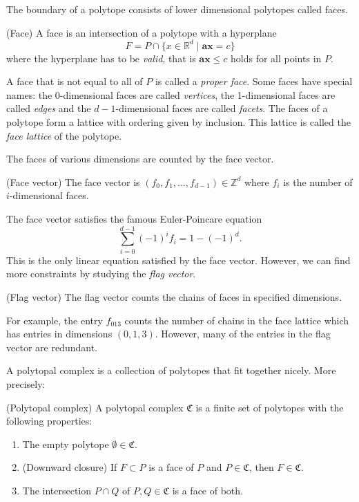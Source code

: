  The boundary 
of a polytope consists of lower dimensional polytopes called faces. 
\begin{definition}
 (Face) A face is an intersection of a polytope with a hyperplane 
\begin{equation}
 F = P \cap \{x \in \mathbb{R}^d \mid \mathbf{a}\mathbf{x} = c\}
\end{equation}
where the hyperplane has to be \textit{valid}, that is $\mathbf{a}\mathbf{x} 
\leq c$ holds for all points in $P$. 

\end{definition}
A face that is not equal to all of $P$ is called a \textit{proper face}.
Some faces have special names: the 0-dimensional faces are called 
\textit{vertices}, the 1-dimensional faces are called \textit{edges} and the 
$d-1$-dimensional faces are called \textit{facets}.
 The faces of a polytope 
form a lattice with ordering given by inclusion. This lattice is called the 
\textit{face lattice} of the polytope.

The faces of various dimensions 
are counted by the face vector.
\begin{definition}
 (Face vector) The face vector is $(f_0, f_1, \dots, f_{d-1}) \in \mathbb{Z}^d$ 
where $f_i$ is 
the number of $i$-dimensional faces.
\end{definition}
The face vector satisfies the famous Euler-Poincare equation
\begin{equation}
 \sum_{i=0}^{d-1} (-1)^i f_i = 1 - (-1)^d.
\end{equation}
This is the only linear equation satisfied by the face vector. However, we can 
find more constraints by studying the \textit{flag vector}.

\begin{definition}
 (Flag vector) The flag vector counts the chains of faces in specified 
dimensions.
\end{definition}

For example, the entry $f_{013}$ counts the number of chains in the face 
lattice which has entries in dimensions $(0,1,3)$. However, many of the entries 
in the flag vector are redundant.

A polytopal complex is a collection of polytopes that fit together nicely.
More precisely:
\begin{definition}
 (Polytopal complex) A polytopal complex $\mathfrak{C}$ is a finite set of 
polytopes with the following properties:
\begin{enumerate}
 \item The empty polytope $\emptyset \in \mathfrak{C}$.
  \item (Downward closure) If $F \subset P$ is a face of $P$ and $P \in 
\mathfrak{C}$, then 
$F \in \mathfrak{C}$.
\item The intersection $P\cap Q$ of $P,Q \in \mathfrak{C}$ is a face of both.

\end{enumerate}

\end{definition}

